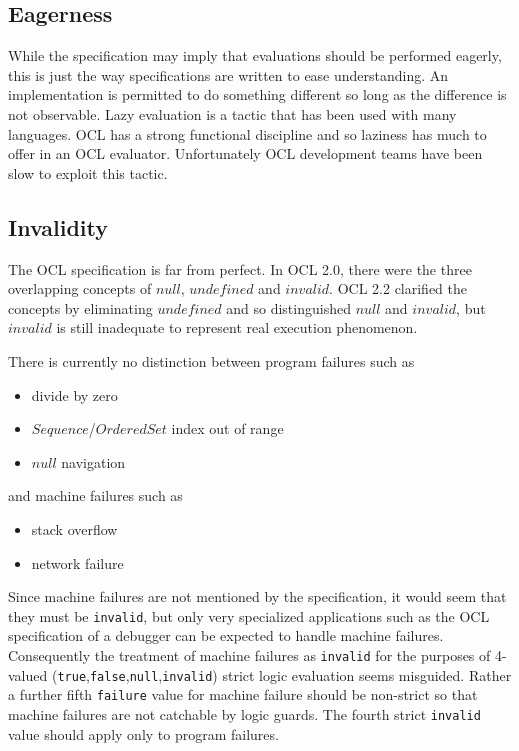 \documentclass{llncs}
\begin{document}
\subsection{Eagerness}

While the specification may imply that evaluations should be performed eagerly, this is just the way specifications are written to ease understanding. An implementation is permitted to do something different so long as the difference is not observable. Lazy evaluation is a tactic that has been used with many languages. OCL has a strong functional discipline and so laziness has much to offer in an OCL evaluator. Unfortunately OCL development teams have been slow to exploit this tactic.

\subsection{Invalidity}

The OCL specification is far from perfect. In OCL 2.0, there were the three overlapping concepts of $null$, $undefined$ and $invalid$. OCL 2.2 clarified the concepts by eliminating $undefined$ and so distinguished $null$ and $invalid$, but $invalid$ is still inadequate to represent real execution phenomenon.

There is currently no distinction between program failures such as
\begin{itemize}
	\item divide by zero
	\item $Sequence$/$OrderedSet$ index out of range
	\item $null$ navigation
\end{itemize}

and machine failures such as
\begin{itemize}
	\item stack overflow
	\item network failure
\end{itemize}

Since machine failures are not mentioned by the specification, it would seem that they must be \verb$invalid$, but only very specialized applications such as the OCL specification of a debugger can be expected to handle machine failures. Consequently the treatment of machine failures as \verb$invalid$ for the purposes of 4-valued (\verb$true$,\verb$false$,\verb$null$,\verb$invalid$) strict logic evaluation seems misguided. Rather a further fifth \verb$failure$ value for machine failure should be non-strict so that machine failures are not catchable by logic guards. The fourth strict \verb$invalid$ value should apply only to program failures.
\end{document}
